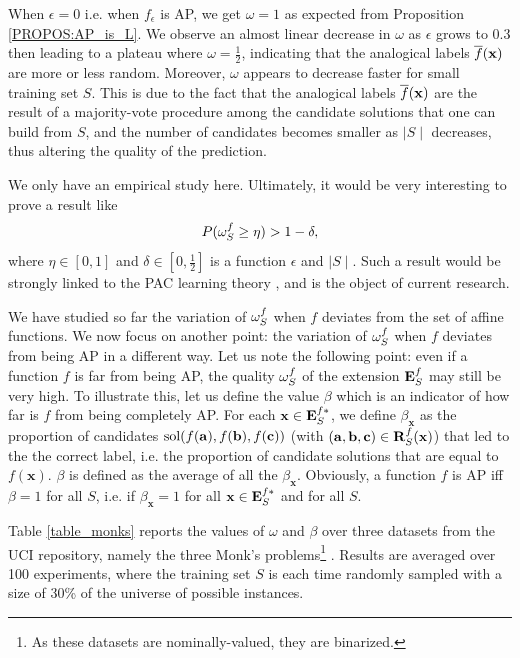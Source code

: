 When $\epsilon = 0$ i.e. when $f_\epsilon$ is AP, we get $\omega = 1$ as expected from
Proposition \ref{PROPOS:AP_is_L}. We observe an almost linear decrease in $\omega$ as
$\epsilon$ grows to $0.3$ then leading to a plateau where $\omega =
\frac{1}{2}$, indicating that the analogical labels $\overline{f}(\mathbf{x})$ are
more or less random. Moreover, $\omega$ appears to decrease faster for small
training set $S$. This is due to the fact that the analogical labels
$\overline{f}(\mathbf{x})$ are the result of a majority-vote procedure among the
candidate solutions that one can build from $S$, and the number of candidates
becomes smaller as $\mid S\mid$ decreases, thus altering the quality of the
prediction.

We only have an empirical study here. Ultimately, it would be very interesting
to prove a result like
$$P(\omega_{S}^{f} \geq \eta) > 1 - \delta,$$
where $\eta \in [0, 1]$ and $\delta \in [0, \frac{1}{2}]$ is a function
$\epsilon$ and $\mid S \mid$. Such a result would be strongly linked to the PAC
learning theory \cite{Val72}, and is the object of current research.



We have studied so far the variation of $\omega_{S}^{f}$ when $f$ deviates from
the set of affine functions. We now focus on another point: the variation of
$\omega_{S}^{f}$ when $f$ deviates from being AP in a different way.
Let us note the following point: even if a function $f$ is far from being
AP, the quality $\omega_{S}^{f}$ of the extension $\mathbf{E}_{S}^{f}$ may still be very
high. To illustrate this, let us define the value $\beta$ which is an indicator
of how far is $f$ from being completely AP.  For each $\mathbf{x} \in
\mathbf{E}_{S}^{f*}$, we define $\beta_\mathbf{x}$ as the proportion of
candidates $\text{sol}(f(\mathbf{a}), f(\mathbf{b}), f(\mathbf{c}))$ (with
$(\mathbf{a}, \mathbf{b}, \mathbf{c}) \in \mathbf{R}_{S}^{f}(\mathbf{x})$) that led to the the correct
label, i.e. the proportion of candidate solutions that are equal to
$f(\mathbf{x})$. $\beta$ is defined as the average of all the
$\beta_\mathbf{x}$.  Obviously, a function $f$ is AP iff $\beta = 1$ for all
$S$, i.e. if $\beta_\mathbf{x} = 1$ for all $\mathbf{x} \in \mathbf{E}_{S}^{f*}$
and for all $S$.

Table \ref{table_monks} reports the values of $\omega$ and $\beta$ over three
datasets from the UCI repository, namely the three Monk's problems\footnote{As
these datasets are nominally-valued, they are binarized.} \cite{UCIrepo}.
Results are averaged over 100 experiments, where the training set $S$ is each
time randomly sampled with a size of $30$\% of the universe of possible
instances.

